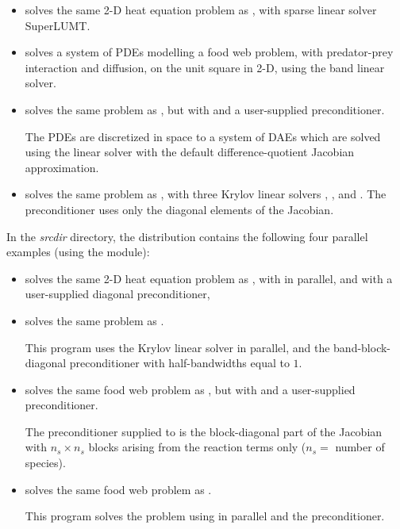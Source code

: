 \begin{itemize}
\item {}
  solves the same 2-D heat equation problem as , with
  sparse linear solver SuperLUMT.

\item {}
  solves a system of PDEs modelling a food web problem, with predator-prey
  interaction and diffusion, on the unit square in 2-D, using the band
  linear solver.

\item {}
  solves the same problem as , but with {\sunlinsolspgmr}
  and a user-supplied preconditioner.

  The PDEs are discretized in space to a system of DAEs which are solved
  using the {\sunlinsolband} linear solver with the default difference-quotient 
  Jacobian approximation.

\item {}
  solves the same problem as , with three Krylov linear solvers
  {\sunlinsolspgmr}, {\sunlinsolspbcgs}, and {\sunlinsolsptfqmr}.  The
  preconditioner uses only the diagonal elements of the Jacobian.

\end{itemize}

\vspace{0.2in}\noindent
In the {\em srcdir} directory, the {\ida} 
distribution contains the following four parallel examples 
(using the {\nvecp} module):
\begin{itemize}

\item {}
  solves the same 2-D heat equation problem as , with {\sunlinsolspgmr}
  in parallel, and with a user-supplied diagonal preconditioner,
  
\item {}
  solves the same problem as .

  This program  uses the Krylov linear solver {\sunlinsolspgmr} in parallel, and the
  band-block-diagonal preconditioner {\idabbdpre} with half-bandwidths equal to $1$.

\item {}
  solves the same food web problem as , but with {\sunlinsolspgmr}
  and a user-supplied preconditioner.
  
  The preconditioner supplied to {\sunlinsolspgmr} is the block-diagonal part of 
  the Jacobian with $n_s \times n_s$ blocks arising from the reaction terms only
  ($n_s =$ number of species).

\item {}
  solves the same food web problem as .

  This program solves the problem using {\sunlinsolspgmr} in parallel and the
  {\idabbdpre} preconditioner.

\end{itemize}


